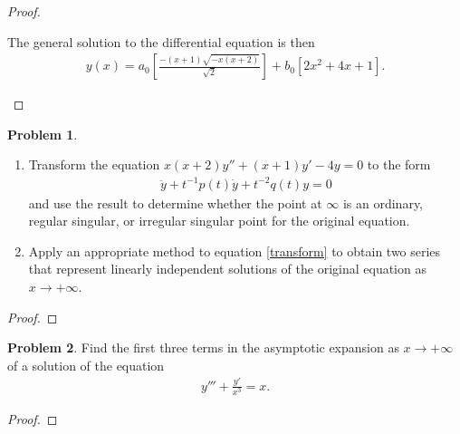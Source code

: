 \documentclass[12pt]{article}
\theoremstyle{definition}
\newtheorem{problem}{Problem}
\begin{document}
\begin{proof}
\begin{enumerate}
      The general solution to the differential equation is then
      \begin{align}\label{gen_sol}
        y(x) = a_0\left[\frac{-(x+1)\sqrt{-x(x+2)}}{\sqrt{2}}\right] + b_0\left[2x^2+4x+1\right].
      \end{align}
  \end{enumerate}
\end{proof}
\newpage


\begin{problem}
  \begin{enumerate}
    \item Transform the equation $x(x+2)y'' + (x+1)y' - 4y = 0$ to the form
      \begin{align}\label{transform}
        \ddot{y} + t^{-1}p(t)\dot{y} + t^{-2}q(t)y = 0
      \end{align}
      and use the result to determine whether the point at $\infty$ is an ordinary, regular
      singular, or irregular singular point for the original equation.
    \item Apply an appropriate method to equation \eqref{transform}  to obtain
      two series that represent linearly independent solutions of the original
      equation as $x \to +\infty$.
  \end{enumerate}
\end{problem}

\begin{proof}
\end{proof}
\newpage


\begin{problem}
  Find the first three terms in the asymptotic expansion as $x \to +\infty$
  of a solution of the equation
  \begin{align*}
    y''' + \frac{y'}{x^3} = x.
  \end{align*}
\end{problem}

\begin{proof}
\end{proof}
\end{document}
